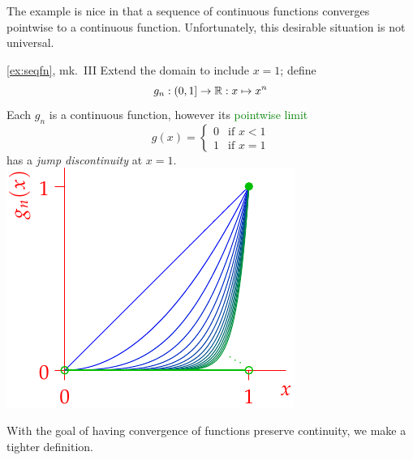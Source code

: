 The example is nice in that a sequence of continuous functions converges pointwise to a continuous function. Unfortunately, this desirable situation is not universal.

\begin{example*}[lower separated=false, sidebyside, sidebyside align=top seam, sidebyside gap=0pt, righthand width=0.4\linewidth]{\ref{ex:seqfn}, mk.\ III}{}
Extend the domain to include $x=1$; define
\[g_n:(0,1]\to\mathbb{R}: x\mapsto x^n\]
Each $g_n$ is a continuous function, however its \textcolor{Green}{pointwise limit}
\[g(x)=\begin{cases}
0&\text{if }x<1\\
1&\text{if }x=1
\end{cases}\]
has a \emph{jump discontinuity} at $x=1$.
\tcblower
\flushright\includegraphics{seqex3}
\end{example*}



% 




With the goal of having convergence of functions preserve continuity, we make a tighter definition.



